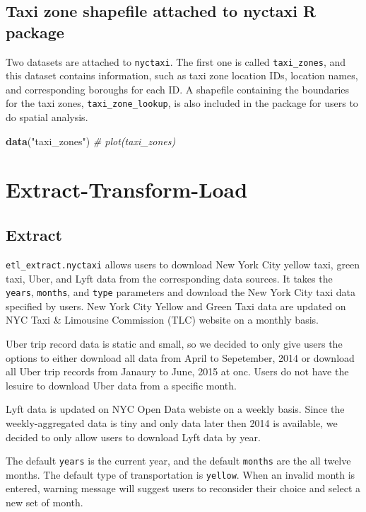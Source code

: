 \documentclass[12pt,twoside]{reedthesis}
\newenvironment{Shaded}{\begin{snugshade}}{\end{snugshade}}
\newcommand{\KeywordTok}[1]{\textcolor[rgb]{0.13,0.29,0.53}{\textbf{#1}}}
\newcommand{\StringTok}[1]{\textcolor[rgb]{0.31,0.60,0.02}{#1}}
\newcommand{\CommentTok}[1]{\textcolor[rgb]{0.56,0.35,0.01}{\textit{#1}}}
\newcommand{\NormalTok}[1]{#1}
\theoremstyle{definition}
\theoremstyle{definition}
\theoremstyle{definition}
\theoremstyle{remark}
\begin{document}
\subsection{Taxi zone shapefile attached to nyctaxi R
package}\label{taxi-zone-shapefile-attached-to-nyctaxi-r-package}

Two datasets are attached to \texttt{nyctaxi}. The first one is called
\texttt{taxi\_zones}, and this dataset contains information, such as
taxi zone location IDs, location names, and corresponding boroughs for
each ID. A shapefile containing the boundaries for the taxi zones,
\texttt{taxi\_zone\_lookup}, is also included in the package for users
to do spatial analysis.
\begin{Shaded}
\begin{Highlighting}[]
\KeywordTok{data}\NormalTok{(}\StringTok{"taxi_zones"}\NormalTok{)}
\CommentTok{# plot(taxi_zones)}
\end{Highlighting}
\end{Shaded}
\section{Extract-Transform-Load}\label{extract-transform-load}

\subsection{Extract}\label{extract}

\texttt{etl\_extract.nyctaxi} allows users to download New York City
yellow taxi, green taxi, Uber, and Lyft data from the corresponding data
sources. It takes the \texttt{years}, \texttt{months}, and \texttt{type}
parameters and download the New York City taxi data specified by users.
New York City Yellow and Green Taxi data are updated on NYC Taxi \&
Limousine Commission (TLC) website on a monthly basis.

Uber trip record data is static and small, so we decided to only give
users the options to either download all data from April to Sepetember,
2014 or download all Uber trip records from Janaury to June, 2015 at
onc. Users do not have the lesuire to download Uber data from a specific
month.

Lyft data is updated on NYC Open Data webiste on a weekly basis. Since
the weekly-aggregated data is tiny and only data later then 2014 is
available, we decided to only allow users to download Lyft data by year.

The default \texttt{years} is the current year, and the default
\texttt{months} are the all twelve months. The default type of
transportation is \texttt{yellow}. When an invalid month is entered,
warning message will suggest users to reconsider their choice and select
a new set of month.
\end{document}
